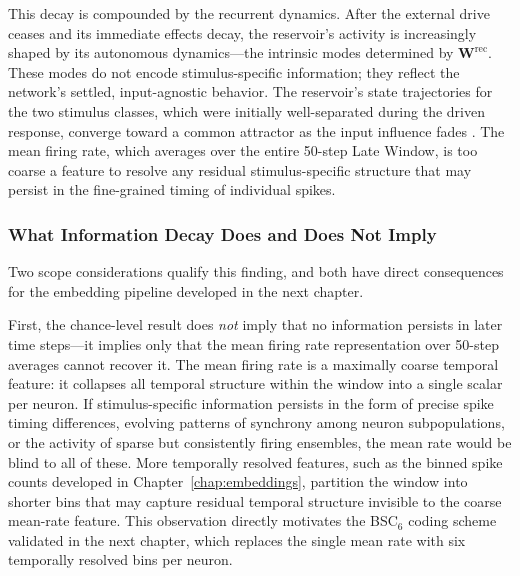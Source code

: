 This decay is compounded by the recurrent dynamics. After the external drive ceases and its immediate effects decay, the reservoir's activity is increasingly shaped by its autonomous dynamics---the intrinsic modes determined by $\mathbf{W}^{\text{rec}}$. These modes do not encode stimulus-specific information; they reflect the network's settled, input-agnostic behavior. The reservoir's state trajectories for the two stimulus classes, which were initially well-separated during the driven response, converge toward a common attractor as the input influence fades \cite{Sussillo2009, Barak2017}. The mean firing rate, which averages over the entire 50-step Late Window, is too coarse a feature to resolve any residual stimulus-specific structure that may persist in the fine-grained timing of individual spikes.

\subsubsection{What Information Decay Does and Does Not Imply}

Two scope considerations qualify this finding, and both have direct consequences for the embedding pipeline developed in the next chapter.

First, the chance-level result does \emph{not} imply that no information persists in later time steps---it implies only that the mean firing rate representation over 50-step averages cannot recover it. The mean firing rate is a maximally coarse temporal feature: it collapses all temporal structure within the window into a single scalar per neuron. If stimulus-specific information persists in the form of precise spike timing differences, evolving patterns of synchrony among neuron subpopulations, or the activity of sparse but consistently firing ensembles, the mean rate would be blind to all of these. More temporally resolved features, such as the binned spike counts developed in Chapter~\ref{chap:embeddings}, partition the window into shorter bins that may capture residual temporal structure invisible to the coarse mean-rate feature. This observation directly motivates the BSC$_6$ coding scheme validated in the next chapter, which replaces the single mean rate with six temporally resolved bins per neuron.

